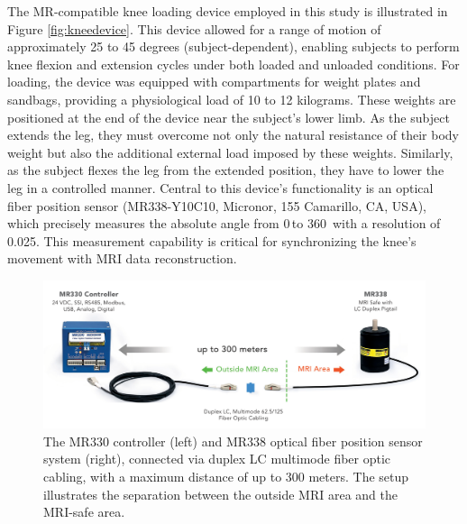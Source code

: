 \documentclass{micro-econ-thesis}
\begin{document}
The MR-compatible knee loading device employed in this study is illustrated in Figure \ref{fig:kneedevice}. This device allowed for a range of motion of approximately 25 to 45 degrees (subject-dependent), enabling subjects to perform knee flexion and extension cycles under both loaded and unloaded conditions. For loading, the device was equipped with compartments for weight plates and sandbags, providing a physiological load of 10 to 12 kilograms. These weights are positioned at the end of the device near the subject's lower limb. As the subject extends the leg, they must overcome not only the natural resistance of their body weight but also the additional external load imposed by these weights. Similarly, as the subject flexes the leg from the extended position, they have to lower the leg in a controlled manner. Central to this device's functionality is an optical fiber position sensor (MR338-Y10C10, Micronor, 155 Camarillo, CA, USA), which precisely  measures the ab­solute angle from 0{\degree}\,to 360\degree \, with a resolution of 0.025\degree \parencite{rickenbach_optical_2013}. This measurement capability is critical for synchronizing the knee's movement with MRI data reconstruction. 
\begin{figure} [H]
	\centering
	\includegraphics[width=0.7\linewidth]{sensor_img}
	\caption{The MR330 controller (left) and MR338 optical fiber position sensor system (right), connected via duplex LC multimode fiber optic cabling, with a maximum distance of up to 300 meters. The setup illustrates the separation between the outside MRI area and the MRI-safe area.}
	\label{fig:sensorimg}
\end{figure}
\end{document}
